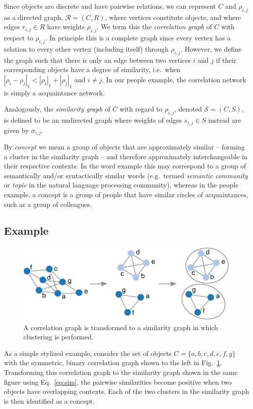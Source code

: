 \documentclass{kais}
\newcommand{\rn}[1]{\rho_{#1}}
\newcommand{\rns}[1]{|\rn{#1}|_1}
\newcommand{\sy}[1]{\sigma_{#1}}
\newcommand{\dnm}[2]{|\rn{#1}-\rn{#2}|_1}
\begin{document}
Since objects are discrete and have pairwise relations, we can represent $C$ and $\rn{i,j}$ as a directed graph,
$\mathcal{R} = (C, R)$, where vertices constitute objects, and where edges $r_{i,j} \in R$ have weights $\rn{i,j}$. We
term this the \emph{correlation graph} of $C$ with respect to $\rn{i,j}$. In principle this is a complete graph since
every vertex has a relation to every other vertex (including itself) through $\rn{i,j}$. However, we define the graph
such that there is only an edge between two vertices $i$ and $j$ if their corresponding objects have a degree of
similarity, i.e.\ when $\dnm{i}{j} < \rns{i} + \rns{j}$ and $i \neq j$. In our people example, the correlation network 
is simply a acquaintance network.

Analogously, the \emph{similarity graph} of $C$ with regard to $\rn{i,j}$, denoted $\mathcal{S} = (C, S)$, is defined
to be an undirected graph where weights of edges $s_{i,j} \in S$ instead are given by $\sy{i,j}$.

By \emph{concept} we mean a group of objects that are approximately similar -- forming a cluster in 
the similarity graph -- and therefore approximately interchangeable in their respective contexts. In the word example 
this may correspond to a group of semantically and/or syntactically similar words (e.g.\ termed \emph{semantic community} 
or \emph{topic} in the natural language processing community), whereas in the people example, a concept is a group of 
people that have similar circles of acquaintances, such as a group of colleagues.

\subsection{Example}

\begin{figure}
\centerline{\includegraphics[width=0.65\columnwidth]{figures/examplegraphs.pdf}}
\caption{A correlation graph is transformed to a similarity graph in which clustering is performed.}
\label{fig:examplegraphs}
\end{figure}

As a simple stylized example, consider the set of objects $C = \{a,b,c,d,e,f,g\}$ with the symmetric, binary correlation 
graph shown to the left in Fig.\ \ref{fig:examplegraphs}. Transforming this correlation graph to the similarity graph shown in 
the same figure using Eq.\ \ref{eq:sim}, the pairwise similarities become positive when two objects have overlapping contexts. 
Each of the two clusters in the similarity graph is then identified as a concept.
\end{document}
